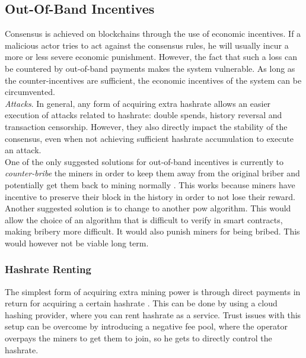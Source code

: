 \documentclass[12pt,a4paper]{article}
\begin{document}
\subsection{Out-Of-Band Incentives}

Consensus is achieved on \glspl{blockchain} through the use of economic incentives. If a malicious actor tries to act against the consensus rules, he will usually incur a more or less severe economic punishment. However, the fact that such a loss can be countered by out-of-band payments makes the system vulnerable. As long as the counter-incentives are sufficient, the economic incentives of the system can be circumvented.\\

\textit{Attacks}. In general, any form of acquiring extra hashrate allows an easier execution of attacks related to \gls{hashrate}: double spends, history reversal and transaction censorship. However, they also directly impact the stability of the \gls{consensus}, even when not achieving sufficient \gls{hashrate} accumulation to execute an attack.\\

One of the only suggested solutions for out-of-band incentives is currently to \textit{counter-bribe} the miners in order to keep them away from the original briber and potentially get them back to mining normally \cite{ethcc}. This works because miners have incentive to preserve their block in the history in order to not lose their \gls{reward}.\\

Another suggested solution is to change to another \acrshort{pow} algorithm. This would allow the choice of an algorithm that is difficult to verify in smart contracts, making bribery more difficult. It would also punish miners for being bribed. This would however not be viable long term.\\

\subsubsection{Hashrate Renting}

The simplest form of acquiring extra mining power is through direct payments in return for acquiring a certain \gls{hashrate} \cite{bribery}. This can be done by using a cloud hashing provider, where you can rent \gls{hashrate} as a service. Trust issues with this setup can be overcome by introducing a negative fee \gls{pool}, where the operator overpays the miners to get them to join, so he gets to directly control the \gls{hashrate}.\\
\end{document}
